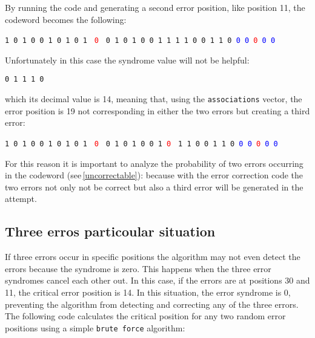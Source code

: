 \noindent By running the code and generating a second error position, like position 11, the codeword becomes the following:

\begin{center}
    \texttt{1 0 1 0 0 1 0 1 0 1 } \textcolor{red}{\texttt{0 }} \texttt{0 1 0 1 0 0 1 1 1 1 0 0 1 1 0 }\textcolor{blue}{\texttt{0 0 }}\textcolor{red}{\texttt{0 }}\textcolor{blue}{\texttt{0 0}}
\end{center}

\noindent Unfortunately in this case the syndrome value will not be helpful:

\begin{center}
    \texttt{0 1 1 1 0}
\end{center}

\noindent which its decimal value is 14, meaning that, using the \texttt{associations} vector, the error position is 19 not corresponding in either the two errors but creating a third error:
\begin{center}
    \texttt{1 0 1 0 0 1 0 1 0 1 } \textcolor{red}{\texttt{0 }} \texttt{0 1 0 1 0 0 1 }\textcolor{red}{\texttt{0 }} \texttt{1 1 0 0 1 1 0 }\textcolor{blue}{\texttt{0 0 }}\textcolor{red}{\texttt{0 }}\textcolor{blue}{\texttt{0 0}}
\end{center}

\noindent For this reason it is important to analyze the probability of two errors occurring in the codeword (see\,\ref{uncorrectable}): because with the error correction code the two errors not only not be correct but also a third error will be generated in the attempt.

\subsection*{Three erros particoular situation}
If three errors occur in specific positions the algorithm may not even detect the errors because the syndrome is zero. This happens when the three error syndromes cancel each other out. In this case, if the errors are at positions 30 and 11, the critical error position is 14. In this situation, the error syndrome is 0, preventing the algorithm from detecting and correcting any of the three errors. The following code calculates the critical position for any two random error positions using a simple \texttt{brute force} algorithm:

